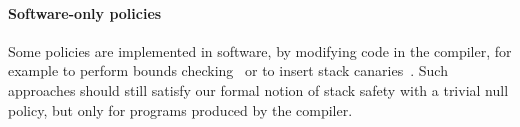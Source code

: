 \documentclass[acmsmall,review,anonymous]{acmart}\settopmatter{printfolios=true,printccs=false,printacmref=false}
\begin{document}

\paragraph*{Software-only policies}
%
Some policies are implemented in software, by modifying code in the
compiler, for example to perform bounds checking~\citep{NagarakatteZMZ09} or
to insert stack canaries~\citep{Cowan+98}. Such approaches should
still satisfy our formal notion of stack safety with a trivial null
policy, but only for programs produced by the compiler.


\end{document}
